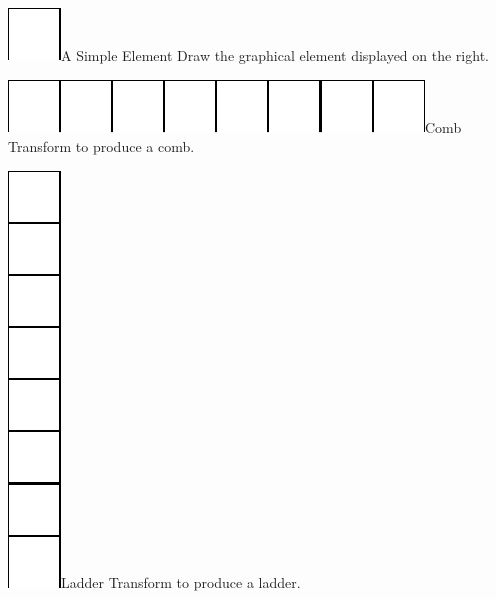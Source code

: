\begin{exofigwithsizeandtitle}{\includegraphics{loopSimpleElement}}{A Simple Element}\label{exo:element}
Draw the graphical element displayed on the right.
\end{exofigwithsizeandtitle}




\begin{exofigwithsizeandtitle}[0.3]{\includegraphics{loopComb}}{Comb}\label{exo:comb}
Transform   to produce a comb.
\end{exofigwithsizeandtitle}



\begin{exofigwithsizeandtitle}{\includegraphics{loopLadder}}{Ladder}\label{exo:ladder}
Transform  to produce a ladder.
\end{exofigwithsizeandtitle}


